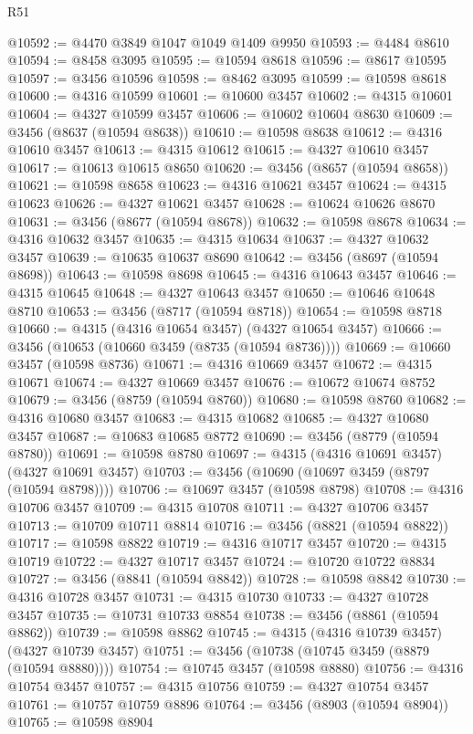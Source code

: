 \begin{lexlean}{R51}
\begin{coremodule}
@10592 := @4470 @3849 @1047 @1049 @1409 @9950
@10593 := @4484 @8610
@10594 := @8458 @3095
@10595 := @10594 @8618
@10596 := @8617 @10595
@10597 := @3456 @10596
@10598 := @8462 @3095
@10599 := @10598 @8618
@10600 := @4316 @10599
@10601 := @10600 @3457
@10602 := @4315 @10601
@10604 := @4327 @10599 @3457
@10606 := @10602 @10604 @8630
@10609 := @3456 (@8637 (@10594 @8638))
@10610 := @10598 @8638
@10612 := @4316 @10610 @3457
@10613 := @4315 @10612
@10615 := @4327 @10610 @3457
@10617 := @10613 @10615 @8650
@10620 := @3456 (@8657 (@10594 @8658))
@10621 := @10598 @8658
@10623 := @4316 @10621 @3457
@10624 := @4315 @10623
@10626 := @4327 @10621 @3457
@10628 := @10624 @10626 @8670
@10631 := @3456 (@8677 (@10594 @8678))
@10632 := @10598 @8678
@10634 := @4316 @10632 @3457
@10635 := @4315 @10634
@10637 := @4327 @10632 @3457
@10639 := @10635 @10637 @8690
@10642 := @3456 (@8697 (@10594 @8698))
@10643 := @10598 @8698
@10645 := @4316 @10643 @3457
@10646 := @4315 @10645
@10648 := @4327 @10643 @3457
@10650 := @10646 @10648 @8710
@10653 := @3456 (@8717 (@10594 @8718))
@10654 := @10598 @8718
@10660 := @4315 (@4316 @10654 @3457) (@4327 @10654 @3457)
@10666 := @3456 (@10653 (@10660 @3459 (@8735 (@10594 @8736))))
@10669 := @10660 @3457 (@10598 @8736)
@10671 := @4316 @10669 @3457
@10672 := @4315 @10671
@10674 := @4327 @10669 @3457
@10676 := @10672 @10674 @8752
@10679 := @3456 (@8759 (@10594 @8760))
@10680 := @10598 @8760
@10682 := @4316 @10680 @3457
@10683 := @4315 @10682
@10685 := @4327 @10680 @3457
@10687 := @10683 @10685 @8772
@10690 := @3456 (@8779 (@10594 @8780))
@10691 := @10598 @8780
@10697 := @4315 (@4316 @10691 @3457) (@4327 @10691 @3457)
@10703 := @3456 (@10690 (@10697 @3459 (@8797 (@10594 @8798))))
@10706 := @10697 @3457 (@10598 @8798)
@10708 := @4316 @10706 @3457
@10709 := @4315 @10708
@10711 := @4327 @10706 @3457
@10713 := @10709 @10711 @8814
@10716 := @3456 (@8821 (@10594 @8822))
@10717 := @10598 @8822
@10719 := @4316 @10717 @3457
@10720 := @4315 @10719
@10722 := @4327 @10717 @3457
@10724 := @10720 @10722 @8834
@10727 := @3456 (@8841 (@10594 @8842))
@10728 := @10598 @8842
@10730 := @4316 @10728 @3457
@10731 := @4315 @10730
@10733 := @4327 @10728 @3457
@10735 := @10731 @10733 @8854
@10738 := @3456 (@8861 (@10594 @8862))
@10739 := @10598 @8862
@10745 := @4315 (@4316 @10739 @3457) (@4327 @10739 @3457)
@10751 := @3456 (@10738 (@10745 @3459 (@8879 (@10594 @8880))))
@10754 := @10745 @3457 (@10598 @8880)
@10756 := @4316 @10754 @3457
@10757 := @4315 @10756
@10759 := @4327 @10754 @3457
@10761 := @10757 @10759 @8896
@10764 := @3456 (@8903 (@10594 @8904))
@10765 := @10598 @8904

\end{coremodule}
\end{lexlean}
